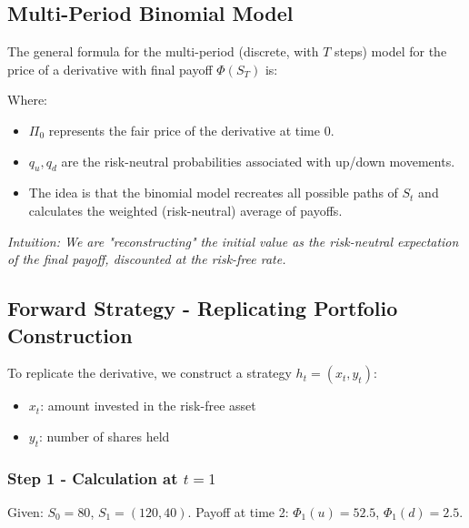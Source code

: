 \documentclass[12pt,a4paper]{article}
\theoremstyle{definition}
\begin{document}
\subsection{Multi-Period Binomial Model}

The general formula for the multi-period (discrete, with $T$ steps) model for the price of a derivative with final payoff $\Phi(S_T)$ is:

\begin{center}
\end{center}

Where:
\begin{itemize}
\item $\Pi_0$ represents the fair price of the derivative at time 0.
\item $q_u, q_d$ are the risk-neutral probabilities associated with up/down movements.
\item The idea is that the binomial model recreates all possible paths of $S_t$ and calculates the weighted (risk-neutral) average of payoffs.
\end{itemize}

\textit{Intuition: We are "reconstructing" the initial value as the risk-neutral expectation of the final payoff, discounted at the risk-free rate.}

\subsection{Forward Strategy - Replicating Portfolio Construction}

To replicate the derivative, we construct a strategy $h_t = (x_t, y_t)$:
\begin{itemize}
\item $x_t$: amount invested in the risk-free asset
\item $y_t$: number of shares held
\end{itemize}

\subsubsection{Step 1 - Calculation at $t=1$}

Given: $S_0 = 80$, $S_1 = (120, 40)$.
Payoff at time 2: $\Phi_1(u) = 52.5$, $\Phi_1(d) = 2.5$.
\end{document}
